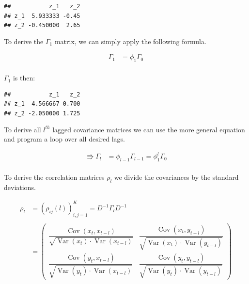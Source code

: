 \documentclass[12pt,a4paper]{article}
\newcommand{\Var}{\operatorname{Var}}
\newcommand{\Cov}{\operatorname{Cov}}
\newenvironment{Shaded}{\begin{snugshade}}{\end{snugshade}}
\newcommand{\NormalTok}[1]{#1}
\newcommand{\OperatorTok}[1]{\textcolor[rgb]{0.81,0.36,0.00}{\textbf{#1}}}
\newcommand{\StringTok}[1]{\textcolor[rgb]{0.31,0.60,0.02}{#1}}
\begin{document}
\begin{verbatim}
##           z_1   z_2
## z_1  5.933333 -0.45
## z_2 -0.450000  2.65
\end{verbatim}

To derive the \(\Gamma_1\) matrix, we can simply apply the following
formula.

\begin{align*}
  \Gamma_1 & = \phi_1 \Gamma_0\\
\end{align*}

\begin{Shaded}
\end{Shaded}

\(\Gamma_1\) is then:

\begin{verbatim}
##           z_1   z_2
## z_1  4.566667 0.700
## z_2 -2.050000 1.725
\end{verbatim}

To derive all \(l^{th}\) lagged covariance matrices we can use the more
general equation and program a loop over all desired lags.

\begin{align*}
  \Rrightarrow \Gamma_l & = \phi_{l-1} \Gamma_{l-1} = \phi_1^{l} \Gamma_0\\
\end{align*}

To derive the correlation matrices \(\rho_l\) we divide the covariances
by the standard deviations.

\begin{align*}
 \rho_l & = \left( \rho_{ij} (l)\right)_{i,j = 1}^{K} = D^{-1} \Gamma_l D^{-1}  \\
 \\
   & = 
  \begin{pmatrix}
    \dfrac{\Cov(x_t , x_{t-l})}{\sqrt{\Var(x_t) \cdot \Var(x_{t- l})}} &
    \dfrac{\Cov(x_t , y_{t-l})}{\sqrt{\Var(x_t) \cdot \Var(y_{t- l})}}\\
    \dfrac{\Cov(y_t , x_{t-l})}{\sqrt{\Var(y_t) \cdot \Var(x_{t- l})}} &
    \dfrac{\Cov(y_t , y_{t-l})}{\sqrt{\Var(y_t) \cdot \Var(y_{t- l})}}
  \end{pmatrix}\\
\end{align*}
\end{document}
